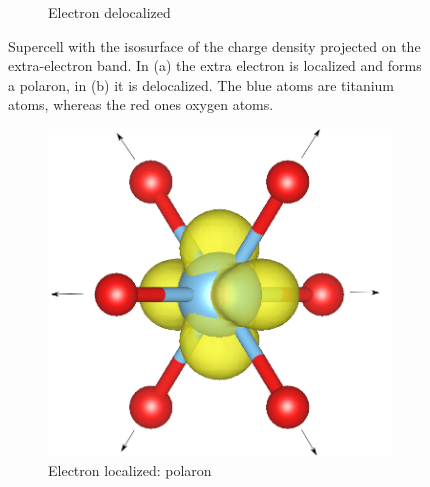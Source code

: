 \begin{figure}
\begin{subfigure}[b]{0.49\textwidth}
        \caption{Electron delocalized}
        \label{fig:delocalized_iso}
    \end{subfigure}
    \caption{Supercell with the isosurface of the charge density projected on the extra-electron band. In (a) the extra electron is localized and forms a polaron, in (b) it is delocalized. The blue atoms are titanium atoms, whereas the red ones oxygen atoms.
    }
    \label{fig:isosurfaces_supercell}
\end{figure}

\begin{figure}
    \centering
    \begin{subfigure}[b]{0.49\textwidth}
        \centering
        \includegraphics[width=\textwidth]{figures/PARCHG_polaron}
        \caption{Electron localized: polaron}
        \label{fig:polaron_iso}
    \end{subfigure}
    \hfill
    \begin{subfigure}[b]{0.49\textwidth}
        \centering

\end{subfigure}
\end{figure}
